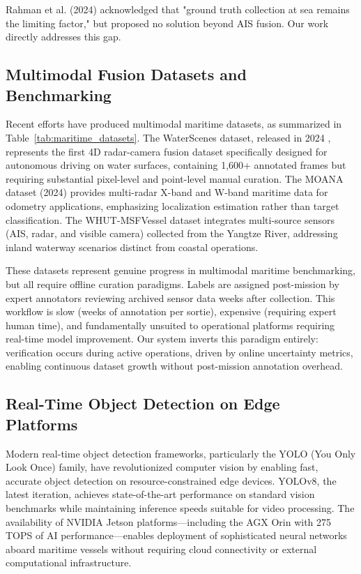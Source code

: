 \documentclass[twocolumn, 10pt]{article}
\begin{document}
Rahman et al. (2024) \cite{Rahman2024RadarClassification} acknowledged that "ground truth collection at sea remains the limiting factor," but proposed no solution beyond AIS fusion. Our work directly addresses this gap.

\subsection{Multimodal Fusion Datasets and Benchmarking}

Recent efforts have produced multimodal maritime datasets, as summarized in Table~\ref{tab:maritime_datasets}. The WaterScenes dataset, released in 2024 \cite{Zhang2024WaterScenes}, represents the first 4D radar-camera fusion dataset specifically designed for autonomous driving on water surfaces, containing 1,600+ annotated frames but requiring substantial pixel-level and point-level manual curation. The MOANA dataset (2024) \cite{Park2024MOANARadar} provides multi-radar X-band and W-band maritime data for odometry applications, emphasizing localization estimation rather than target classification. The WHUT-MSFVessel dataset integrates multi-source sensors (AIS, radar, and visible camera) collected from the Yangtze River, addressing inland waterway scenarios distinct from coastal operations.

These datasets represent genuine progress in multimodal maritime benchmarking, but all require offline curation paradigms. Labels are assigned post-mission by expert annotators reviewing archived sensor data weeks after collection. This workflow is slow (weeks of annotation per sortie), expensive (requiring expert human time), and fundamentally unsuited to operational platforms requiring real-time model improvement. Our system inverts this paradigm entirely: verification occurs during active operations, driven by online uncertainty metrics, enabling continuous dataset growth without post-mission annotation overhead.

\subsection{Real-Time Object Detection on Edge Platforms}

Modern real-time object detection frameworks, particularly the YOLO (You Only Look Once) family, have revolutionized computer vision by enabling fast, accurate object detection on resource-constrained edge devices. YOLOv8, the latest iteration, achieves state-of-the-art performance on standard vision benchmarks while maintaining inference speeds suitable for video processing. The availability of NVIDIA Jetson platforms---including the AGX Orin with 275 TOPS of AI performance---enables deployment of sophisticated neural networks aboard maritime vessels without requiring cloud connectivity or external computational infrastructure.
\end{document}
